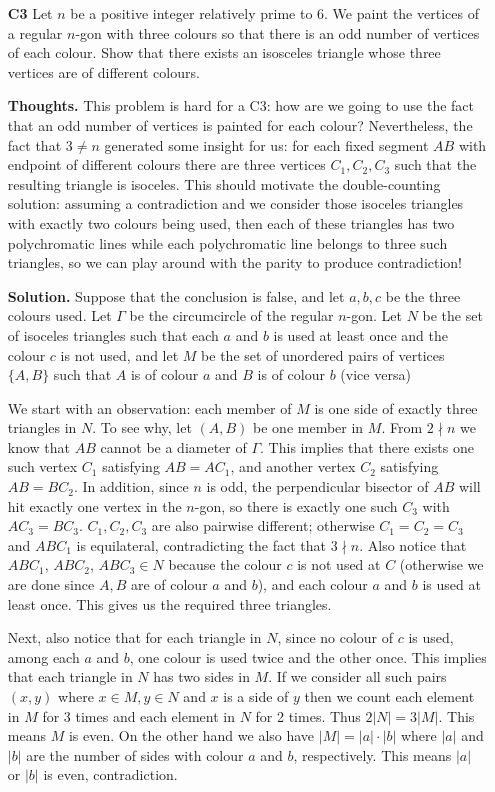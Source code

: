\documentclass[11pt,a4paper]{article}
\begin{document}
\begin{itemize}
\newpage
\item[\textbf{C3}]
Let $n$ be a positive integer relatively prime to $6$. We paint the vertices of a regular $n$-gon with three colours so that there is an odd number of vertices of each colour. Show that there exists an isosceles triangle whose three vertices are of different colours.

\textbf{Thoughts.} 
This problem is hard for a C3: how are we going to use the fact that an odd number of vertices is painted for each colour? 
Nevertheless, the fact that $3\neq n$ generated some insight for us: for each fixed segment $AB$ with endpoint of different colours there are three vertices $C_1, C_2, C_3$ such that the resulting triangle is isoceles. 
This should motivate the double-counting solution: assuming a contradiction and we consider those isoceles triangles with exactly two colours being used, then each of these triangles has two polychromatic lines while each polychromatic line belongs to three such triangles, so we can play around with the parity to produce contradiction!

\textbf{Solution.} 
Suppose that the conclusion is false, and let $a, b, c$ be the three colours used. 
Let $\Gamma$ be the circumcircle of the regular $n$-gon. 
Let $N$ be the set of isoceles triangles such that each $a$ and $b$ is used at least once and the colour $c$ is not used, 
and let $M$ be the set of unordered pairs of vertices $\{A, B\}$ such that $A$ is of colour $a$ and $B$ is of colour $b$ (vice versa) 

We start with an observation: each member of $M$ is one side of exactly three triangles in $N$. 
To see why, let $(A,B)$ be one member in $M$. From $2\nmid n$ we know that $AB$ cannot be a diameter of $\Gamma$. 
This implies that there exists one such vertex $C_1$ satisfying $AB=AC_1$, and another vertex $C_2$ satisfying $AB=BC_2$. 
In addition, since $n$ is odd, the perpendicular bisector of $AB$ will hit exactly one vertex in the $n$-gon, 
so there is exactly one such $C_3$ with $AC_3=BC_3$. 
$C_1, C_2, C_3$ are also pairwise different; otherwise $C_1=C_2=C_3$ and $ABC_1$ is equilateral, 
contradicting the fact that $3\nmid n$. 
Also notice that $ABC_1$, $ABC_2$, $ABC_3\in N$ because the colour $c$ is not used at $C$ (otherwise we are done since $A, B$ are of colour $a$ and $b$), and each colour $a$ and $b$ is used at least once. 
This gives us the required three triangles. 

Next, also notice that for each triangle in $N$, 
since no colour of $c$ is used, among each $a$ and $b$, one colour is used twice and the other once. 
This implies that each triangle in $N$ has two sides in $M$. 
If we consider all such pairs $(x, y)$ where $x\in M, y\in N$ and $x$ is a side of $y$ then we count each element in $M$ for 3 times and each element in $N$ for 2 times. 
Thus $2|N|=3|M|$. 
This means $M$ is even. On the other hand we also have $|M|=|a|\cdot |b|$ where $|a|$ and $|b|$ are the number of sides with colour $a$ and $b$, respectively. This means $|a|$ or $|b|$ is even, contradiction. 


\end{itemize}
\end{document}
